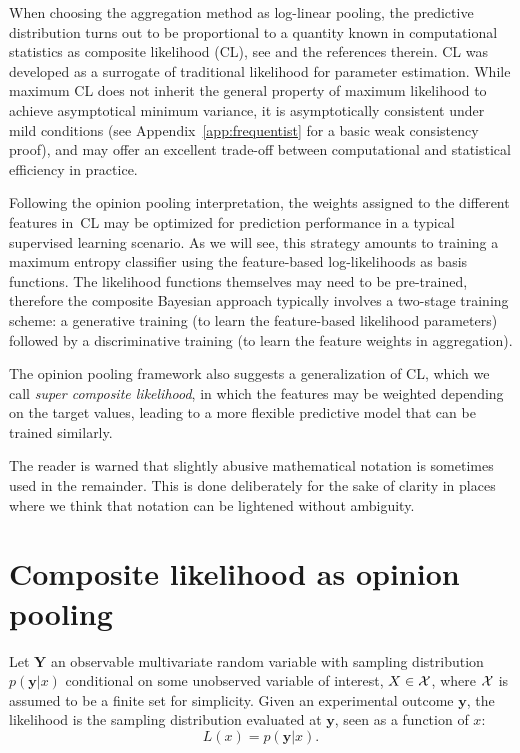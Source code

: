\documentclass[english]{scrartcl}
\def\y{{\mathbf{y}}}
\begin{document}

When choosing the aggregation method as log-linear pooling, the predictive distribution turns out to be proportional to a quantity known in computational statistics as composite likelihood (CL), see \cite{Varin-11} and the references therein. CL was developed as a surrogate of traditional likelihood for parameter estimation. While maximum CL does not inherit the general property of maximum likelihood to achieve asymptotical minimum variance, it is asymptotically consistent under mild conditions \cite{Xu-11} (see Appendix~\ref{app:frequentist} for a basic weak consistency proof), and may offer an excellent trade-off between computational and statistical efficiency in practice.

Following the opinion pooling interpretation, the weights assigned to the different features in~CL may be optimized for prediction performance in a typical supervised learning scenario. As we will see, this strategy amounts to training a maximum entropy classifier using the feature-based log-likelihoods as basis functions. The likelihood functions themselves may need to be pre-trained, therefore the composite Bayesian approach typically involves a two-stage training scheme: a generative training (to learn the feature-based likelihood parameters) followed by a discriminative training (to learn the feature weights in aggregation).

The opinion pooling framework also suggests a generalization of CL, which we call {\em super composite likelihood}, in which the features may be weighted depending on the target values, leading to a more flexible predictive model that can be trained similarly.


The reader is warned that slightly abusive mathematical notation is sometimes used in the remainder. This is done deliberately for the sake of clarity in places where we think that notation can be lightened without ambiguity. 


\section{Composite likelihood as opinion pooling}
\label{sec:log_pool}

Let $\mathbf{Y}$ an observable multivariate random variable with sampling distribution $p(\y|x)$ conditional on some unobserved variable of interest, $X\in{\cal X}$, where ${\cal X}$ is assumed to be a finite set for simplicity. Given an experimental outcome $\y$, the likelihood is the sampling distribution evaluated at $\y$, seen as a function of $x$:
$$
L(x) = p(\y|x).
$$
\end{document}
